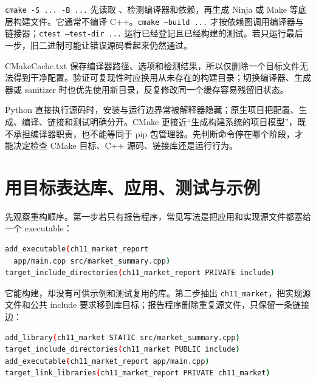 \texttt{cmake -S ... -B ...} 先读取 、检测编译器和依赖，再生成 Ninja 或 Make 等底层构建文件。它通常不编译 C++。\texttt{cmake --build ...} 才按依赖图调用编译器与链接器；\texttt{ctest --test-dir ...} 运行已经登记且已经构建的测试。若只运行最后一步，旧二进制可能让错误源码看起来仍然通过。

CMakeCache.txt 保存编译器路径、选项和检测结果，所以仅删除一个目标文件无法得到干净配置。验证可复现性时应换用从未存在的构建目录；切换编译器、生成器或 sanitizer 时也优先使用新目录，反复修改同一个缓存容易残留旧状态。

\begin{pythonbridge}
Python 直接执行源码时，安装与运行边界常被解释器隐藏；原生项目把配置、生成、编译、链接和测试明确分开。CMake 更接近“生成构建系统的项目模型”，既不承担编译器职责，也不能等同于 pip 包管理器。先判断命令停在哪个阶段，才能决定检查 CMake 目标、C++ 源码、链接库还是运行行为。

\end{pythonbridge}

\section{用目标表达库、应用、测试与示例}

先观察重构顺序。第一步若只有报告程序，常见写法是把应用和实现源文件都塞给一个 executable：

\begin{lstlisting}[language=bash,numbers=none]
add_executable(ch11_market_report
  app/main.cpp src/market_summary.cpp)
target_include_directories(ch11_market_report PRIVATE include)
\end{lstlisting}

它能构建，却没有可供示例和测试复用的库。第二步抽出 \texttt{ch11\_market}，把实现源文件和公共 include 要求移到库目标；报告程序删除重复源文件，只保留一条链接边：

\begin{lstlisting}[language=bash,numbers=none]
add_library(ch11_market STATIC src/market_summary.cpp)
target_include_directories(ch11_market PUBLIC include)
add_executable(ch11_market_report app/main.cpp)
target_link_libraries(ch11_market_report PRIVATE ch11_market)
\end{lstlisting}

